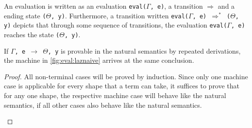 An evaluation is written as an evaluation \texttt{eval($\Gamma$, e)}, a transition $\Rightarrow$ and a ending state \texttt{($\Theta$, y)}.
Furthermore, a transition written \texttt{eval($\Gamma$, e) $\Rightarrow^*$ ($\Theta$, y)} depicts that through some sequence of transitions, the evaluation \texttt{eval($\Gamma$, e)} reaches the state \texttt{($\Theta$, y)}.
\begin{theorem}
  \label{theorem:conclusion}
  If \texttt{$\Gamma$, e $\rightarrow$ $\Theta$, y} is provable in the natural semantics by repeated derivations, the machine in \autoref{fig:eval:laznaive} arrives at the same conclusion.
\end{theorem}
\begin{proof}
All non-terminal cases will be proved by induction.
Since only one machine case is applicable for every shape that a term can take, it suffices to prove that for any one shape, the respective machine case will behave like the natural semantics, if all other cases also behave like the natural semantics.
  \begin{pcases}
\end{pcases}
\end{proof}
